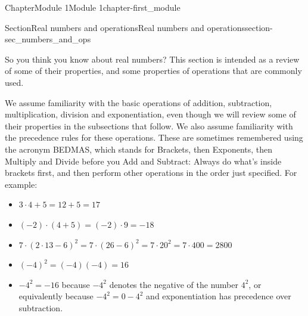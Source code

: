 \documentclass[oneside,10pt,]{book}
\begin{document}
\setcounter{tocdepth}{1}
\renewcommand*\contentsname{Contents}
\tableofcontents
\mainmatter
%
%
\typeout{************************************************}
\typeout{************************************************}
%
\begin{chapterptx}{Chapter}{Module 1}{}{Module 1}{}{}{chapter-first_module}
\renewcommand*{\chaptername}{Chapter}
%
%
\typeout{************************************************}
\typeout{************************************************}
%
\begin{sectionptx}{Section}{Real numbers and operations}{}{Real numbers and operations}{}{}{section-sec_numbers_and_ops}
\begin{introduction}{}%
So you think you know about real numbers?  This section is intended as a review of some of their properties, and some properties of operations that are commonly used.%
\par
We assume familiarity with the basic operations of addition, subtraction, multiplication, division and exponentiation, even though we will review some of their properties in the subsections that follow.  We also assume familiarity with the precedence rules for these operations.  These are sometimes remembered using the acronym BEDMAS, which stands for Brackets, then Exponents, then Multiply and Divide before you Add and Subtract: Always do what's inside brackets first, and then perform other operations in the order just specified.  For example:%
\par
%
\begin{itemize}[label=\textbullet]
\item{}\(\displaystyle 3 \cdot 4 + 5 = 12 + 5 = 17\)%
\item{}\(\displaystyle (-2) \cdot (4 + 5) = (-2) \cdot 9 = -18\)%
\item{}\(\displaystyle 7 \cdot (2 \cdot 13 - 6)^2 = 7 \cdot (26 - 6)^2 = 7 \cdot 20^2 = 7 \cdot 400 = 2800\)%
\item{}\(\displaystyle (-4)^2 = (-4)(-4) = 16\)%
\item{}\(-4^2 = -16\) because \(-4^2\) denotes the negative of the number \(4^2\), or equivalently because \(-4^2 = 0-4^2\) and exponentiation has precedence over subtraction.%
\end{itemize}
%
\end{introduction}%
%
%
\typeout{************************************************}

\end{sectionptx}
\end{chapterptx}
\end{document}
